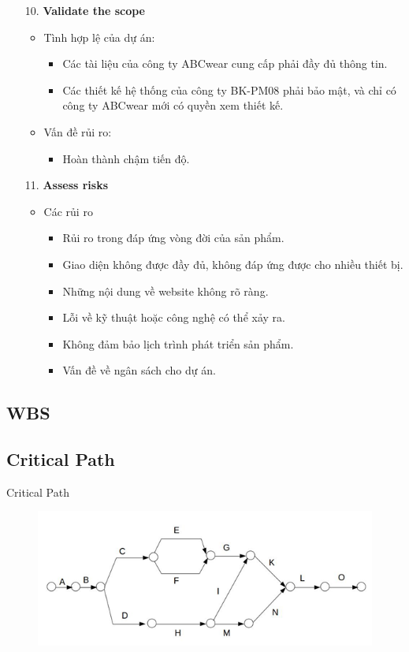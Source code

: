\documentclass[compress]{beamer}
\begin{document}
\begin{frame}
\begin{itemize}
\item[10. ] \textbf{Validate the scope}
\begin{itemize}
\item Tình hợp lệ của dự án:
\begin{itemize}
\item Các tài liệu của công ty ABCwear cung cấp phải đầy đủ thông tin.
\item Các thiết kế hệ thống của công ty BK-PM08 phải bảo mật, và chỉ có công ty ABCwear mới có quyền xem thiết kế.
\end{itemize}
\item Vấn đề rủi ro:
\begin{itemize}
\item Hoàn thành chậm tiến độ.
\end{itemize}
\end{itemize}
\item[11. ] \textbf{Assess risks}
\begin{itemize}
\item Các rủi ro
\begin{itemize}
\item Rủi ro trong đáp ứng vòng đời của sản phẩm.
\item Giao diện không được đầy đủ, không đáp ứng được cho nhiều thiết bị.
\item Những nội dung về website không rõ ràng.
\item Lỗi về kỹ thuật hoặc công nghệ có thể xảy ra.
\item Không đảm bảo lịch trình phát triển sản phẩm.
\item Vấn đề về ngân sách cho dự án.
\end{itemize}
\end{itemize}
\end{itemize}
\end{frame}
\subsection{WBS}
\subsection{Critical Path}
\begin{frame}{Critical Path}
\begin{figure}[h]
\begin{center}
\includegraphics[scale=0.7]{QT2.png}
\end{center}
\end{figure}
\end{frame}
\end{document}
